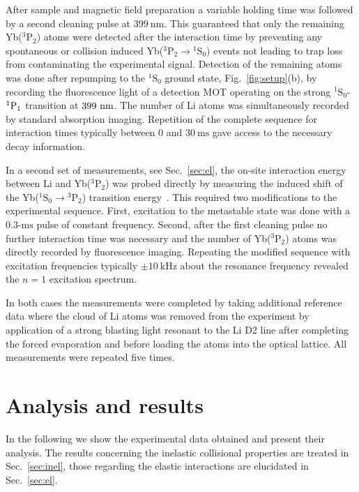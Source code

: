 \documentclass[twocolumn,superscriptaddress,showpacs,floatfix,amsmath,amssymb]{revtex4-1}
\newcommand{\singlet}{{}^1\mathrm{S}_0}
\newcommand{\triplet}{{}^3\mathrm{P}_2}
\newcommand{\nm}{\mathrm{nm}}
\newcommand{\msec}{\mathrm{ms}}
\newcommand{\kHz}{\mathrm{kHz}}
\begin{document}
After sample and magnetic field preparation a variable holding time was
followed by a second cleaning pulse at $399~\nm$. This guaranteed that only
the remaining Yb($\triplet$) atoms were detected after the interaction time
by preventing any spontaneous or collision induced Yb($\triplet
\rightarrow \singlet$) events not leading to trap loss from contaminating
the experimental signal. Detection of the remaining atoms was done after
repumping to the $\singlet$ ground state, Fig.~\ref{fig:setup}(b), by
recording the fluorescence light of a detection MOT operating on the strong
$\singlet$-$^1{\rm P}_1$ transition at $399~\rm{nm}$. The number of Li atoms
was simultaneously recorded by standard absorption imaging. Repetition of the
complete sequence for interaction times typically between $0$ and $30~\msec$
gave access to the necessary decay information.

In a second set of measurements, see Sec.~\ref{sec:el}, the on-site
interaction energy between Li and Yb($\triplet$) was probed directly by
measuring the induced shift of the Yb($\singlet \rightarrow \triplet$)
transition energy~\cite{konishi_collisional_2016}. This required two
modifications to the experimental sequence. First, excitation to the
metastable state was done with a \mbox{$0.3$-$\msec$} pulse of constant
frequency. Second, after the first cleaning pulse no further interaction time
was necessary and the number of Yb($\triplet$) atoms was directly recorded by
fluorescence imaging. Repeating the modified sequence with excitation
frequencies typically $\pm 10~\kHz$ about the resonance frequency revealed the
$n = 1$ excitation spectrum.

In both cases the measurements were completed by taking additional reference
data where the cloud of Li atoms was removed from the experiment by
application of a strong blasting light resonant to the Li D2 line after
completing the forced evaporation and before loading the atoms into the
optical lattice. All measurements were repeated five times.

\section{Analysis and results}
\label{sec:results}

In the following we show the experimental data obtained and present their
analysis. The results concerning the inelastic collisional properties are
treated in Sec.~\ref{sec:inel}, those regarding the elastic interactions are
elucidated in Sec.~\ref{sec:el}.
\end{document}
